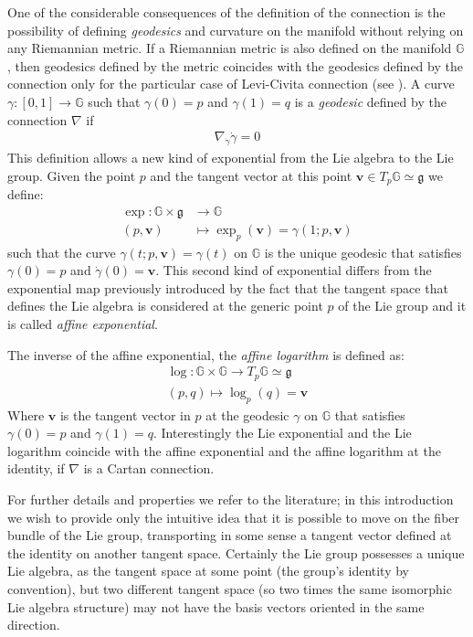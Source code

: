 One of the considerable consequences of the definition of the connection is the possibility of defining \emph{geodesics} and curvature on the manifold without relying on any Riemannian metric. If a Riemannian metric is also defined on the manifold $\mathbb{G} $, then geodesics defined by the metric coincides with the geodesics defined by the connection only for the particular case of Levi-Civita connection (see \cite{do1992riemannian}). A curve $\gamma:[0,1]\rightarrow \mathbb{G}$ such that $\gamma(0)=p$ and $\gamma(1) = q$ is a \emph{geodesic} defined by the connection $\nabla$ if 
\begin{align}\label{def:geodesics_eq}
\nabla_{\dot{\gamma}}\dot{\gamma} = 0 %
\end{align}
This definition allows a new kind of exponential from the Lie algebra to the Lie group. Given the point $p$ and the tangent vector at this point $\mathbf{v} \in T_{p}\mathbb{G}\simeq \mathfrak{g}$ we define: 
\begin{align*}
\exp :  \mathbb{G}  \times \mathfrak{g}     &\longrightarrow \mathbb{G}  
\\ 
(p,\mathbf{v}) &\longmapsto \exp_{p}(\mathbf{v})  = \gamma(1; p,\mathbf{v})
\end{align*}
such that the curve $\gamma(t;p,\mathbf{v}) = \gamma(t)$ on $\mathbb{G}$ is the unique geodesic that satisfies $\gamma(0) = p$ and $\dot{\gamma}(0) =  \mathbf{v} $.
This second kind of exponential differs from the exponential map previously introduced by the fact that the tangent space that defines the Lie algebra is considered at the generic point $p$ of the Lie group and it is called \emph{affine exponential}.

\noindent
The inverse of the affine exponential, the \emph{affine logarithm} is defined as:
\begin{align*}
\log :  \mathbb{G}  \times \mathbb{G}   \longrightarrow T_{p}\mathbb{G}   \simeq \mathfrak{g} 
\\ 
(p,q) \longmapsto \log_{p}(q)  = \mathbf{v} 
\end{align*}
Where $\mathbf{v} $ is the tangent vector in $p$ at the geodesic $\gamma$ on $\mathbb{G} $ that satisfies $\gamma(0) = p$ and $\gamma(1) = q$. Interestingly the Lie exponential and the Lie logarithm coincide with the affine exponential and the affine logarithm at the identity, if $\nabla$ is a Cartan connection.

For further details and properties we refer to the literature; in this introduction we wish to provide only the intuitive idea that it is possible to move on the fiber bundle of the Lie group, transporting in some sense a tangent vector defined at the identity on another tangent space. Certainly the Lie group possesses a unique Lie algebra, as the tangent space at some point (the group's identity by convention), but two different tangent space (so two times the same isomorphic Lie algebra structure) may not have the basis vectors oriented in the same direction. 

